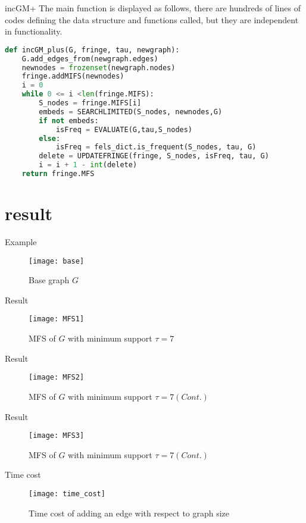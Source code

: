 \documentclass[10pt,aspectratio=43,mathserif]{beamer}
\begin{document}
\begin{frame}[fragile]{incGM+}
The main function is displayed as follows, there are hundreds of lines of codes defining the data structure and functions called, but they are independent in functionality.
\begin{lstlisting}[language=python, frame=single]
def incGM_plus(G, fringe, tau, newgraph):
    G.add_edges_from(newgraph.edges)
    newnodes = frozenset(newgraph.nodes)
    fringe.addMIFS(newnodes)
    i = 0
    while 0 <= i <len(fringe.MIFS):
        S_nodes = fringe.MIFS[i]
        embeds = SEARCHLIMITED(S_nodes, newnodes,G)
        if not embeds:
            isFreq = EVALUATE(G,tau,S_nodes)
        else:
            isFreq = fels_dict.is_frequent(S_nodes, tau, G)
        delete = UPDATEFRINGE(fringe, S_nodes, isFreq, tau, G)
        i = i + 1 - int(delete)
    return fringe.MFS
\end{lstlisting}

\end{frame}
\section{result}
\begin{frame}{Example}

    \begin{figure}[H]
\centering
\texttt{[image: base]}
\caption{Base graph $G$}
\end{figure}

\end{frame}

\begin{frame}{Result}

    \begin{figure}[H]
\centering
\texttt{[image: MFS1]}
\caption{MFS of $G$ with minimum support $\tau=7$}
\end{figure}

\end{frame}

\begin{frame}{Result}

    \begin{figure}[H]
\centering
\texttt{[image: MFS2]}
        \caption{MFS of $G$ with minimum support $\tau=7(Cont.)$}
\end{figure}

\end{frame}

\begin{frame}{Result}

    \begin{figure}[H]
\centering
\texttt{[image: MFS3]}
        \caption{MFS of $G$ with minimum support $\tau=7(Cont.)$}
\end{figure}

\end{frame}

\begin{frame}{Time cost}
    \begin{figure}[H]
\texttt{[image: time\_cost]}
        \caption{Time cost of adding an edge with respect to graph size}
\end{figure}

\end{frame}

{}

\end{document}
